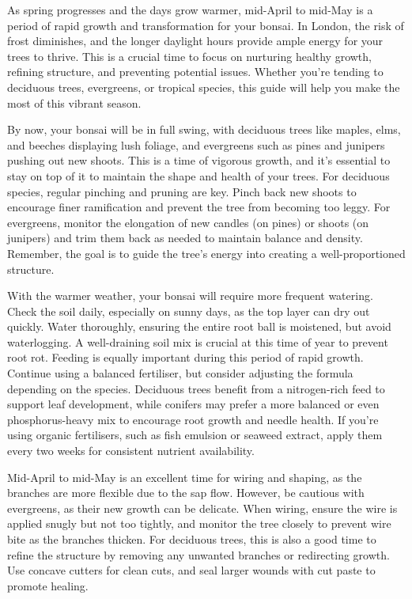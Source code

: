 \label{2025-04-care}
\vspace*{-0.5em}
\noindent
As spring progresses and the days grow warmer, mid\--April to mid\--May is a period of rapid growth and transformation for your bonsai.
In London, the risk of frost diminishes, and the longer daylight hours provide ample energy for your trees to thrive.
This is a crucial time to focus on nurturing healthy growth, refining structure, and preventing potential issues.
Whether you're tending to deciduous trees, evergreens, or tropical species, this guide will help you make the most of this vibrant season.

{}
\noindent
By now, your bonsai will be in full swing, with deciduous trees like maples, elms, and beeches displaying lush foliage, and evergreens such as pines and junipers pushing out new shoots.
This is a time of vigorous growth, and it's essential to stay on top of it to maintain the shape and health of your trees.
%
For deciduous species, regular pinching and pruning are key.
Pinch back new shoots to encourage finer ramification and prevent the tree from becoming too leggy.
For evergreens, monitor the elongation of new candles (on pines) or shoots (on junipers) and trim them back as needed to maintain balance and density.
Remember, the goal is to guide the tree's energy into creating a well\--proportioned structure.

{}
\noindent
With the warmer weather, your bonsai will require more frequent watering.
Check the soil daily, especially on sunny days, as the top layer can dry out quickly.
Water thoroughly, ensuring the entire root ball is moistened, but avoid waterlogging.
A well\--draining soil mix is crucial at this time of year to prevent root rot.
%
Feeding is equally important during this period of rapid growth.
Continue using a balanced fertiliser, but consider adjusting the formula depending on the species.
Deciduous trees benefit from a nitrogen\--rich feed to support leaf development, while conifers may prefer a more balanced or even phosphorus\--heavy mix to encourage root growth and needle health.
If you're using organic fertilisers, such as fish emulsion or seaweed extract, apply them every two weeks for consistent nutrient availability.

{}
\noindent
Mid\--April to mid\--May is an excellent time for wiring and shaping, as the branches are more flexible due to the sap flow.
However, be cautious with evergreens, as their new growth can be delicate.
When wiring, ensure the wire is applied snugly but not too tightly, and monitor the tree closely to prevent wire bite as the branches thicken.
%
For deciduous trees, this is also a good time to refine the structure by removing any unwanted branches or redirecting growth.
Use concave cutters for clean cuts, and seal larger wounds with cut paste to promote healing.

